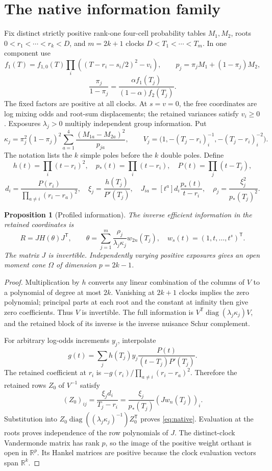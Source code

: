 \documentclass[11pt,reqno]{amsart}
\numberwithin{equation}{section}
\newtheorem{proposition}[theorem]{Proposition}
\theoremstyle{definition}\newtheorem{definition}[theorem]{Definition}
\theoremstyle{remark}\newtheorem{remark}[theorem]{Remark}
\newcommand{\R}{\mathbb R}
\newcommand{\diag}{\operatorname{diag}}
\begin{document}
\section{The native information family}\label{sec:native}
Fix distinct strictly positive rank-one four-cell probability tables $M_1,M_2$, roots $0<r_1<\cdots<r_k<D$, and $m=2k+1$ clocks $D<T_1<\cdots<T_m$. In one component use
\[
 f_1(T)=f_{1,0}(T)\prod_i((T-r_i-s_i/2)^2-v_i),\qquad
 p_j=\pi_jM_1+(1-\pi_j)M_2,
\]
\[
 \frac{\pi_j}{1-\pi_j}=\frac{\alpha f_1(T_j)}{(1-\alpha)f_2(T_j)}.
\]
The fixed factors are positive at all clocks. At $s=v=0$, the free coordinates are log mixing odds and root-sum displacements; the retained variances satisfy $v_i\ge0$. Exposures $\lambda_j>0$ multiply independent group information. Put
\[
 \kappa_j=\pi_j^2(1-\pi_j)^2\sum_{a=1}^4
                   \frac{(M_{1a}-M_{2a})^2}{p_{ja}},
 \qquad V_j=\big(1,-(T_j-r_i)^{-1}_i,-(T_j-r_i)^{-2}_i\big).
\]
The notation lists the $k$ simple poles before the $k$ double poles. Define
\[
 h(t)=\prod_i(t-r_i)^2,\quad p_*(t)=\prod_i(t-r_i),\quad P(t)=\prod_j(t-T_j),
\]
\begin{equation}\label{eq:nativeconstants}
 d_i=\frac{P(r_i)}{\prod_{a\ne i}(r_i-r_a)^2},\quad
 \xi_j=\frac{h(T_j)}{P'(T_j)},\quad
 J_{ia}=[t^a]d_i\frac{p_*(t)}{t-r_i},\quad
 \rho_j=\frac{\xi_j^2}{p_*(T_j)^2}.
\end{equation}
\begin{proposition}[Profiled information]\label{prop:native}
The inverse efficient information in the retained coordinates is
\begin{equation}\label{eq:native}
 R=JH(\theta)J^{\mathsf T},\qquad
 \theta=\sum_{j=1}^m\frac{\rho_j}{\lambda_j\kappa_j}w_{2n}(T_j),
 \quad w_s(t)=(1,t,\ldots,t^s)^{\mathsf T}.
\end{equation}
The matrix $J$ is invertible. Independently varying positive exposures gives an open moment cone $\Omega$ of dimension $p=2k-1$.
\end{proposition}
\begin{proof}
Multiplication by $h$ converts any linear combination of the columns of $V$ to a polynomial of degree at most $2k$. Vanishing at $2k+1$ clocks implies the zero polynomial; principal parts at each root and the constant at infinity then give zero coefficients. Thus $V$ is invertible. The full information is $V^{\mathsf T}\diag(\lambda_j\kappa_j)V$, and the retained block of its inverse is the inverse nuisance Schur complement.

For arbitrary log-odds increments $y_j$, interpolate
\[
 g(t)=\sum_j h(T_j)y_j\frac{P(t)}{(t-T_j)P'(T_j)}.
\]
The retained coefficient at $r_i$ is $-g(r_i)/\prod_{a\ne i}(r_i-r_a)^2$. Therefore the retained rows $Z_0$ of $V^{-1}$ satisfy
\[
 (Z_0)_{ij}=\frac{\xi_jd_i}{T_j-r_i}
           =\frac{\xi_j}{p_*(T_j)}(Jw_n(T_j))_i.
\]
Substitution into $Z_0\diag((\lambda_j\kappa_j)^{-1})Z_0^{\mathsf T}$ proves \eqref{eq:native}. Evaluation at the roots proves independence of the row polynomials of $J$. The distinct-clock Vandermonde matrix has rank $p$, so the image of the positive weight orthant is open in $\R^p$. Its Hankel matrices are positive because the clock evaluation vectors span $\R^k$.
\end{proof}
\end{document}
